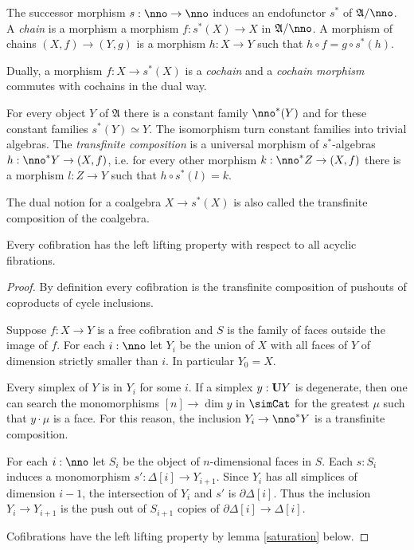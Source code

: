 \documentclass{tac}
\newcommand\hide[1]{}
\newcommand\ri{^*}
\newcommand\of{:}
\newcommand\simplex\Delta
\newcommand\cycle{\partial\Delta}
\newcommand\ambient{\mathfrak A}
\begin{document}
\begin{definition} The successor morphism $s\of\nno\to\nno$ induces an endofunctor $s\ri$ of $\ambient/\nno$. A \emph{chain} is a morphism a morphism $f\of s\ri(X)\to X$ in $\ambient/\nno$.  A morphism of chains $(X,f)\to(Y,g)$ is a morphism $h\of X\to Y$ such that $h\circ f = g\circ s\ri(h)$.

Dually, a morphism $f\of X\to s\ri(X)$ is a \emph{cochain} and a \emph{cochain morphism} commutes with cochains in the dual way.

For every object $Y$ of $\ambient$ there is a constant family $\nno\ri(Y)$ and for these constant families $s\ri(Y)\simeq Y$. The isomorphism turn constant families into trivial algebras. The \emph{transfinite composition} is a universal morphism of $s\ri$-algebras $h\of \nno\ri Y\to (X,f)$, i.e. for every other morphism $k\of \nno\ri Z\to (X,f)$ there is a morphism $l\of Z\to Y$ such that $h\circ s\ri(l)=k$.

The dual notion for a coalgebra $X\to s\ri(X)$ is also called the transfinite composition of the coalgebra.
\end{definition}\hide{Every isomorphism-algebra is a constant family.}

\begin{lemma} Every cofibration has the left lifting property with respect to all acyclic fibrations. \label{Reedy}\end{lemma}

\begin{proof} By definition every cofibration is the transfinite composition of pushouts of coproducts of cycle inclusions.

Suppose $f\of X\to Y$ is a free cofibration and $S$ is the family of faces outside the image of $f$. For each $i\of\nno$ let $Y_i$ be the union of $X$ with all faces of $Y$ of dimension strictly smaller than $i$. In particular $Y_0=X$.

Every simplex of $Y$ is in $Y_i$ for some $i$. If a simplex $y\of\base Y$ is degenerate, then one can search the monomorphisms $[n]\to\dim y$ in $\simCat$ for the greatest $\mu$ such that $y\cdot\mu$ is a face. For this reason, the inclusion $Y_i\to\nno\ri Y$ is a transfinite composition.

For each $i\of\nno$ let $S_i$ be the object of $n$-dimensional faces in $S$. Each $s\of S_i$ induces a monomorphism $s'\of\simplex[i]\to Y_{i+1}$. Since $Y_{i}$ has all simplices of dimension $i-1$, the intersection of $Y_i$ and $s'$ is $\cycle[i]$. Thus the inclusion $Y_i\to Y_{i+1}$ is the push out of $S_{i+1}$ copies of $\cycle[i]\to\simplex[i]$. 

Cofibrations have the left lifting property by lemma \ref{saturation} below.
\end{proof}
\end{document}
